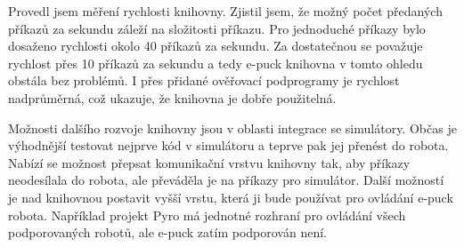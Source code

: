    Provedl jsem měření rychlosti knihovny. Zjistil jsem, že možný
    počet předaných příkazů za sekundu záleží na složitosti příkazu.
    Pro jednoduché příkazy bylo dosaženo rychlosti okolo 40 příkazů za sekundu.
    Za dostatečnou se považuje rychlost přes 10 příkazů za sekundu a tedy
    e-puck knihovna v tomto ohledu obstála bez problémů. I přes přidané
    ověřovací podprogramy je rychlost nadprůměrná, což ukazuje, že knihovna je
    dobře použitelná.

    Možnosti dalšího rozvoje knihovny jsou v oblasti integrace se simulátory.
    Občas je výhodnější testovat nejprve kód v simulátoru a teprve pak jej
    přenést do robota. Nabízí se možnost přepsat komunikační vrstvu knihovny
    tak, aby příkazy neodesílala do robota, ale převáděla je na příkazy pro
    simulátor. Další možností je nad knihovnou postavit vyšší vrstu, která ji
    bude používat pro ovládání e-puck robota. Například projekt Pyro má
    jednotné rozhraní pro ovládání všech podporovaných robotů, ale e-puck zatím
    podporován není.
